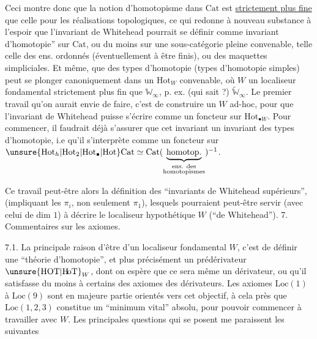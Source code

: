 Ceci montre donc que la notion d'homotopisme dans  $\mathrm{Cat}$ est \uline{strictement plus fine} que celle pour les réalisations topologiques, ce qui redonne à nouveau substance à l'espoir que l'invariant de Whitehead pourrait  se définir comme invariant d'homotopie'' sur $\mathrm{Cat}$, ou du moins sur une sous-catégorie pleine convenable, telle celle des ens. ordonnés (éventuellement  à être finis), ou des maquettes simpliciales. Et même, que  des types d'homotopie (types d'homotopie simples) peut se
plonger canoniquement dans un $\mathrm{Hot}_W$ convenable, où $W$  un localiseur fondamental strictement plus fin que $\mathbb W_\infty$, p. ex. (qui sait ?) $\widetilde{\mathbb W}_\infty$. Le premier travail qu'on aurait envie de faire, c'est de construire un  $W$ ad-hoc, pour que l'invariant de Whitehead puisse s'écrire comme un foncteur sur $\mathrm{Hot}_{\bullet W}$. Pour commencer, il faudrait déjà s'assurer que cet invariant    un invariant des types d'homotopie, i.e qu'il s'interprète comme un foncteur sur $\unsure{\mathrm{Hot}_h|\mathrm{Hot}_2|\mathrm{Hot}_\bullet|\mathrm{Hot}}\mathrm{Cat}\simeq\mathrm{Cat}(\underbrace{\mathrm{homotop.}}_{\substack{\text{ens. des}\\\text{homotopismes}}})^{-1}$.

Ce travail  peut-être alors la définition des ``invariants de Whitehead supérieurs'', (impliquant les $\pi_i$, non seulement  $\pi_1$), lesquels pourraient peut-être servir (avec celui de dim $1$) à décrire le localiseur hypothétique $W$ (``de Whitehead'').
7. Commentaires sur les axiomes.

7.1. La principale raison d'être d'un localiseur fondamental $W$, c'est de définir une ``théorie d'homotopie'', et plus précisément un prédérivateur $\unsure{\mathrm{HOT}|\mathrm{H\!oT}}_W$, dont on espère que ce sera même un dérivateur, ou qu'il satisfasse du moins à certains des axiomes des dérivateurs. Les axiomes $\mathrm{Loc}(1)$ à $\mathrm{Loc}(9)$ sont en majeure partie orientés vers cet objectif, à cela près que $\mathrm{Loc}(1,2,3)$ constitue un ``minimum vital'' absolu, pour pouvoir commencer à travailler avec $W$. Les principales questions qui se posent  me paraissent les suivantes

